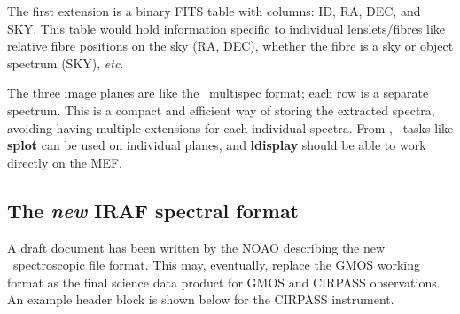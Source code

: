 \documentclass[twoside,11pt]{article}
\newcommand{\htmladdnormallink}[2]{#1}
\newcommand{\htmlref}[2]{#1}
\newcommand{\xlabel}[1]{}
\begin{document}
\begin{\htmlonly}
The first extension is a binary FITS table with columns: ID, RA, DEC,
and SKY.  This table would hold information specific to individual
lenslets/fibres like relative fibre positions on the sky (RA, DEC),
whether the fibre is a sky or object spectrum (SKY), \emph{etc.}

The three image planes are like the \IRAF\
\htmladdnormallink{multispec
format}{http://iraf.noao.edu/iraf/docs/specwcs.ps.Z}; each row is a
separate spectrum.  This is a compact and efficient way of storing the
extracted spectra, avoiding having multiple extensions for each
individual spectra.  From \IRAF, \ONEDSPEC\ tasks like {\bf splot} can
be used on individual planes, and {\bf ldisplay} should be able to work
directly on the MEF.

\subsection{\xlabel{sc16_iraf}The {\em new} IRAF spectral format\label{sc16_iraf}}

A draft document has been written by the NOAO describing the new
\IRAFref\ \htmladdnormallink{spectroscopic file
format}{http://iraf.noao.edu/projects/ccdmosaic/imagedef/spec2d.html}.
This may, eventually, replace the GMOS \htmlref{working
format}{sc16_gmos} as the final science data product for
\htmlref{GMOS}{sc16_gmos} and \htmlref{CIRPASS}{sc16_cirpass}
observations.  An example header block is shown below for the CIRPASS
instrument.


\end{\htmlonly}
\end{document}
